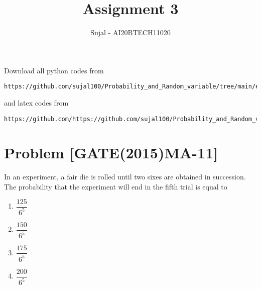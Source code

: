 \documentclass[journal,12pt,twocolumn]{IEEEtran}
\begin{document}
\let\StandardTheFigure\thefigure
\let\vec\mathbf
\renewcommand{\thefigure}{\theproblem}
\def\putbox#1#2#3{\makebox[0in][l]{\makebox[#1][l]{}\raisebox{\baselineskip}[0in][0in]{\raisebox{#2}[0in][0in]{#3}}}}
     \def\rightbox#1{\makebox[0in][r]{#1}}
     \def\centbox#1{\makebox[0in]{#1}}
     \def\topbox#1{\raisebox{-\baselineskip}[0in][0in]{#1}}
     \def\midbox#1{\raisebox{-0.5\baselineskip}[0in][0in]{#1}}
\vspace{3cm}
\title{Assignment 3}
\author{Sujal - AI20BTECH11020}
\maketitle
\newpage
\bigskip
\renewcommand{\thefigure}{\theenumi}
\renewcommand{\thetable}{\theenumi}
Download all python codes from 
\begin{lstlisting}
https://github.com/sujal100/Probability_and_Random_variable/tree/main/exercise_3/codes
\end{lstlisting}

and latex codes from 

\begin{lstlisting}
https://github.com/https://github.com/sujal100/Probability_and_Random_variable/blob/main/exercise_3/exercise_3_main_tex.tex
\end{lstlisting}
\section{Problem [GATE(2015)MA-11]}
In an experiment, a fair die is rolled until two sixes are obtained in succession. The probability that the experiment will end in the fifth trial is equal to\\
\begin{enumerate}[label=\alph*)]
\item $\dfrac{125}{6^{5}}$
\item $\dfrac{150}{6^{5}}$
\item $\dfrac{175}{6^{5}}$
\item $\dfrac{200}{6^{5}}$
\end{enumerate}
\end{document}
